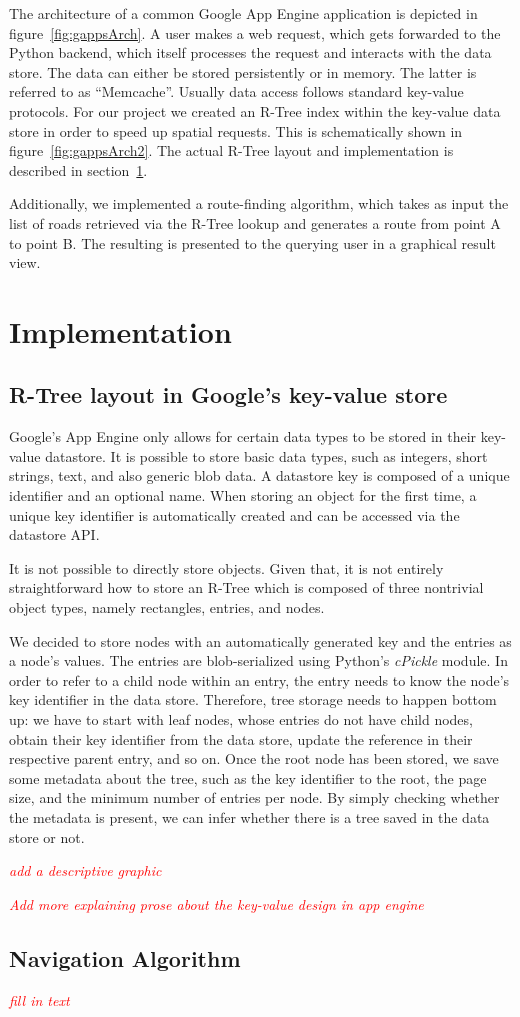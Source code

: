 \documentclass{scrartcl}
\newcommand{\TODO}[1]{\textcolor{red}{\boxed{\mathbf{TODO }} {\textit{#1}} }}
\begin{document}
The architecture of a common Google App Engine application is depicted in figure~\ref{fig:gappsArch}. A user makes a web request, which gets forwarded to the Python backend, which itself processes the request and interacts with the data store. The data can either be stored persistently or in memory. The latter is referred to as ``Memcache''. Usually data access follows standard key-value protocols. For our project we created an R-Tree index within the key-value data store in order to speed up spatial requests. This is schematically shown in figure~\ref{fig:gappsArch2}. The actual R-Tree layout and implementation is described in section~\ref{sec:implementation}.

Additionally, we implemented a route-finding algorithm, which takes as input the list of roads retrieved via the R-Tree lookup and generates a route from point A to point B. The resulting is presented to the querying user in a graphical result view.

\section{Implementation}
\label{sec:implementation}
\subsection{R-Tree layout in Google's key-value store}
Google's App Engine only allows for certain data types to be stored in their key-value datastore. It is possible to store basic data types, such as integers, short strings, text, and also generic blob data. A datastore key is composed of a unique identifier and an optional name. When storing an object for the first time, a unique key identifier is automatically created and can be accessed via the datastore API. 

It is not possible to directly store objects. Given that, it is not entirely straightforward how to store an R-Tree which is composed of three nontrivial object types, namely rectangles, entries, and nodes. 

We decided to store nodes with an automatically generated key and the entries as a node's values. The entries are blob-serialized using Python's \textit{cPickle} module. In order to refer to a child node within an entry, the entry needs to know the node's key identifier in the data store. Therefore, tree storage needs to happen bottom up: we have to start with leaf nodes, whose entries do not have child nodes, obtain their key identifier from the data store, update the reference in their respective parent entry, and so on. Once the root node has been stored, we save some metadata about the tree, such as the key identifier to the root, the page size, and the minimum number of entries per node. By simply checking whether the metadata is present, we can infer whether there is a tree saved in the data store or not.

\TODO{add a descriptive graphic}

\TODO{Add more explaining prose about the key-value design in app engine}

\subsection{Navigation Algorithm}
\TODO{fill in text}


\end{document}
